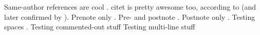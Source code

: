 \documentclass{article}
\begin{document}
Same-author references are cool \citep{foo2010, foo2011lorem, foo2011ipsum, foo2012, foo2011dolor, bar2013}.
citet is pretty awesome too, according to \citet[post]{foo2010} (and later confirmed by \cite{bar2013}).
Prenote only \citep[e.g.][]{foo2011lorem}.
Pre- and postnote \citep[e.g.][and references therein]{foo2011ipsum, foo2011dolor}.
Postnote only \citep[and references therein]{foo2010}.
Testing spaces \citep [pre] [post] {foo2011lorem, bar2013}.
Testing commented-out stuff %
Testing multi-line stuff \citep{foo2010, foo2011dolor,
bar2013}


\end{document}
